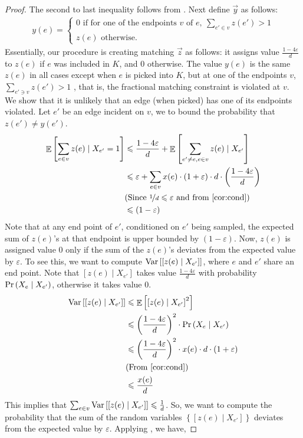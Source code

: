 \documentclass[a4paper,11pt]{article}
\DeclareMathOperator*{\Exp}{\ensuremath{{\mathbb{E}}}}
\DeclareMathOperator*{\Prob}{\ensuremath{\textnormal{Pr}}}
\renewcommand{\Pr}{\Prob}
\newcommand{\prob}[1]{\Pr\paren{#1}}
\newcommand{\paren}[1]{\left ( #1 \right )}
\newcommand{\bracket}[1]{\left [ #1 \right ]}
\newcommand{\expect}[1]{\Exp\bracket{#1}}
\newcommand{\var}[1]{\textnormal{Var}\bracket{#1}}
\newcommand{\set}[1]{\ensuremath{\left\{ #1 \right\}}}
\newcommand{\eps}{\varepsilon}
\theoremstyle{definition}
\theoremstyle{definition}
\theoremstyle{definition}
\theoremstyle{definition}
\theoremstyle{definition}
\theoremstyle{definition}
\theoremstyle{definition}
\theoremstyle{definition}
\theoremstyle{definition}
\theoremstyle{definition}
\theoremstyle{definition}
\theoremstyle{definition}
\theoremstyle{definition}
\theoremstyle{definition}
\theoremstyle{definition}
\begin{document}
\begin{proof}
The second to last inequality follows from . Next define $\vec{y}$ as follows:
\begin{align*}
y(e)=\begin{cases}
0 \text{ if for one of the endpoints }v\text{ of }e,\  \sum_{e'\in v}z(e')>1\\
z(e) \text{ otherwise.}
\end{cases}
\end{align*}
Essentially, our procedure is creating matching $\vec{z}$ as follows: it assigns value $\frac{1-4\eps}{d}$ to $z(e)$ if $e$ was included in $K$, and $0$ otherwise. The value $y(e)$ is the same $z(e)$ in all cases except when $e$ is picked into $K$, but at one of the endpoints $v$, $\sum_{e'\ni v}z(e')>1$ , that is, the fractional matching constraint is violated at $v$. We show that it is unlikely that an edge (when picked) has one of its endpoints violated. Let $e'$ be an edge incident on $v$, we to bound the probability that $z(e')\neq y(e')$. 
\begin{align*}
\expect{\sum_{e\in v}z(e)\mid X_{e'}=1}&\leqslant \frac{1-4\eps}{d}+\expect{\sum_{e'\neq e, e\in v}z(e)\mid X_{e'}}\\
&\leqslant \eps+\sum_{e\in v}x(e)\cdot (1+\eps)\cdot d\cdot\paren{\frac{1-4\eps}{d}}\\
&\text{(Since $\nicefrac{1}{d}\leqslant \eps$ and from \Cref{cor:cond})}\\
&\leqslant (1-\eps)
\end{align*}
Note that at any end point of $e'$, conditioned on $e'$ being sampled, the expected sum of $z(e)$'s at that endpoint is upper bounded by $(1-\eps)$. Now, $z(e)$ is assigned value $0$ only if the sum of the $z(e)$'s deviates from the expected value by $\eps$. To see this, we want to compute $\var{[z(e)\mid X_{e'}]}$, where $e$ and $e'$ share an end point. Note that $[z(e)\mid X_{e'}]$ takes value $\frac{1-4\eps}{d}$ with probability $\prob{X_e\mid X_{e'}}$, otherwise it takes value $0$.
\begin{align*}
\var{\bracket{z(e)\mid X_{e'}}}&\leqslant \expect{\bracket{z(e)\mid X_{e'}}^2}\\
&\leqslant\paren{\frac{1-4\eps}{d}}^2\cdot \prob{X_e\mid X_{e'}}\\
&\leqslant \paren{\frac{1-4\eps}{d}}^2\cdot x(e)\cdot d\cdot (1+\eps)\\
&\text{(From \Cref{cor:cond})}\\
&\leqslant \frac{x(e)}{d}
\end{align*}
This implies that $\sum_{e\in v}\var{\bracket{z(e)\mid X_{e'}}}\leqslant \frac{1}{d}$. So, we want to compute the probability that the sum of the random variables $\set{\bracket{z(e)\mid X_{e'}}}$ deviates from the expected value by $\eps$. Applying , we have,

\end{proof}
\end{document}
